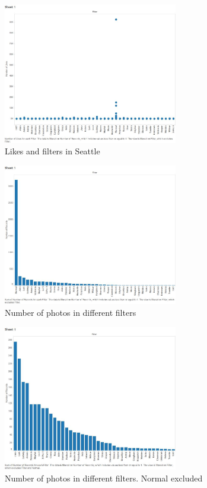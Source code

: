 \documentclass[conference]{acmsiggraph}
\begin{document}
\begin{figure}[ht]
  \centering
  \includegraphics[width=3in]{images/sample_all_filter-like}
  \caption{Likes and filters in Seattle}
  \label{like-filter}
\end{figure}
\begin{figure}[ht]
  \centering
  \includegraphics[width=3in]{images/sample_all_number-filter_sorted}
  \caption{Number of photos in different filters}
  \label{normal}
\end{figure}
\begin{figure}[ht]
  \includegraphics[width=3in]{images/sample_all_number-filter_sorted_no-normal}
  \centering
  \caption{Number of photos in different filters. Normal excluded}
  \label{no-normal}
\end{figure}
\end{document}
